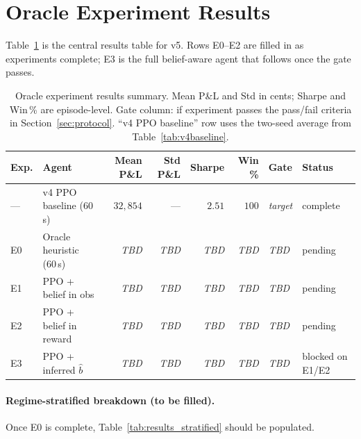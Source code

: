 \documentclass[11pt]{article}
\begin{document}
\section{Oracle Experiment Results}
\label{sec:results}

Table~\ref{tab:results_summary} is the central results table for v5.
Rows E0--E2 are filled in as experiments complete; E3 is the full
belief-aware agent that follows once the gate passes.

\begin{table}[H]
\centering
\begin{tabular}{llrrrrll}
\toprule
\textbf{Exp.} &
\textbf{Agent} &
\textbf{Mean P\&L} &
\textbf{Std P\&L} &
\textbf{Sharpe} &
\textbf{Win \%} &
\textbf{Gate} &
\textbf{Status} \\
\midrule
--- & v4 PPO baseline (60\,s) & $32{,}854$ & --- & $2.51$ & $100$ & \emph{target} & complete \\
\midrule
E0 & Oracle heuristic (60\,s) & \emph{TBD} & \emph{TBD} & \emph{TBD} & \emph{TBD} & \emph{TBD} & pending \\
E1 & PPO + belief in obs      & \emph{TBD} & \emph{TBD} & \emph{TBD} & \emph{TBD} & \emph{TBD} & pending \\
E2 & PPO + belief in reward   & \emph{TBD} & \emph{TBD} & \emph{TBD} & \emph{TBD} & \emph{TBD} & pending \\
E3 & PPO + inferred $\hat{b}$ & \emph{TBD} & \emph{TBD} & \emph{TBD} & \emph{TBD} & \emph{TBD} & blocked on E1/E2 \\
\bottomrule
\end{tabular}
\caption{Oracle experiment results summary.  Mean P\&L and Std in cents;
         Sharpe and Win\,\% are episode-level.  Gate column: \checkmark{} if
         experiment passes the pass/fail criteria in
         Section~\ref{sec:protocol}.  ``v4 PPO baseline'' row uses the
         two-seed average from Table~\ref{tab:v4baseline}.}
\label{tab:results_summary}
\end{table}

\paragraph{Regime-stratified breakdown (to be filled).}
Once E0 is complete, Table~\ref{tab:results_stratified} should be populated.
\end{document}
